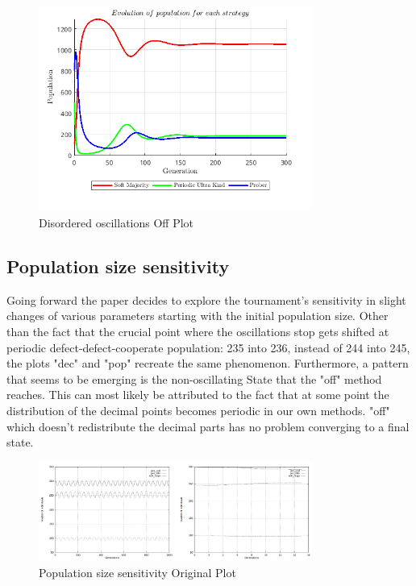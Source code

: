 \documentclass[12pt]{report}
\begin{document}
\begin{figure}[H]
    \centering
    \includegraphics[width=0.8\textwidth]{disordered_oscillations_off.png}
    \caption{Disordered oscillations Off Plot}
\end{figure}

\newpage
\subsection{Population size sensitivity}
Going forward the paper decides to explore the tournament's sensitivity in slight changes of various parameters starting with the initial population size. Other than the fact that the crucial point where the oscillations stop gets shifted at periodic defect-defect-cooperate population: 235 into 236, instead of 244 into 245, the plots "dec" and "pop" recreate the same phenomenon. Furthermore, a pattern that seems to be emerging is the non-oscillating State that the "off" method reaches. This can most likely be attributed to the fact that at some point the distribution of the decimal points becomes periodic in our own methods. "off" which doesn't redistribute the decimal parts has no problem converging to a final state.
\begin{figure}[H]
    \centering
    \includegraphics[width=0.8\textwidth]{population_size_sensitivity.png}
    \caption{Population size sensitivity Original Plot}
\end{figure}
\end{document}
